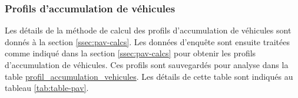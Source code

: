             \subsubsection{Profils d'accumulation de véhicules}
            Les détails de la méthode de calcul des profils d'accumulation de véhicules sont donnés à la section \ref{ssec:pav-calcs}. Les données d'enquête sont ensuite traitées comme indiqué dans la section \ref{ssec:pav-calcs} pour obtenir les profils d'accumulation de véhicules. Ces profils sont sauvegardés pour analyse dans la table \ul{profil\_accumulation\_vehicules}. Les détails de cette table sont indiqués au tableau \ref{tab:table-pav}.\clearpage
            {\captionsetup{justification=centering}
            \setlength{\LTcapwidth}{\linewidth} 
            \newcommand{\TableCaptionPAV}{Champs de la table \ul{profil\_accumulation\_vehicules}}
            \begin{longtable}[c]{m{}|m{}m{}m{}}
                

\end{longtable}}
